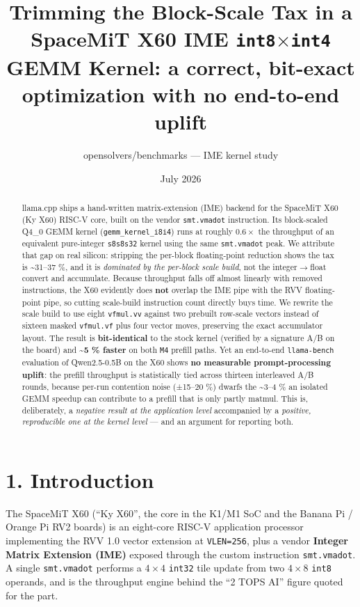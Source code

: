 \documentclass[
]{article}
\title{Trimming the Block-Scale Tax in a SpaceMiT X60 IME
\texttt{int8}\(\times\)\texttt{int4} GEMM Kernel: a correct, bit-exact
optimization with no end-to-end uplift}
\author{opensolvers/benchmarks --- IME kernel study}
\date{July 2026}
\begin{document}
\maketitle
\begin{abstract}
llama.cpp ships a hand-written matrix-extension (IME) backend for the
SpaceMiT X60 (Ky X60) RISC-V core, built on the vendor
\texttt{smt.vmadot} instruction. Its block-scaled Q4\_0 GEMM kernel
(\texttt{gemm\_kernel\_i8i4}) runs at roughly \(0.6\times\) the
throughput of an equivalent pure-integer \texttt{s8s8s32} kernel using
the same \texttt{smt.vmadot} peak. We attribute that gap on real
silicon: stripping the per-block floating-point reduction shows the tax
is \textasciitilde31--37 \%, and it is \emph{dominated by the per-block
scale build}, not the integer\(\to\)float convert and accumulate.
Because throughput falls off almost linearly with removed instructions,
the X60 evidently does \textbf{not} overlap the IME pipe with the RVV
floating-point pipe, so cutting scale-build instruction count directly
buys time. We rewrite the scale build to use eight \texttt{vfmul.vv}
against two prebuilt row-scale vectors instead of sixteen masked
\texttt{vfmul.vf} plus four vector moves, preserving the exact
accumulator layout. The result is \textbf{bit-identical} to the stock
kernel (verified by a signature A/B on the board) and
\textbf{\textasciitilde5 \% faster} on both \texttt{M4} prefill paths.
Yet an end-to-end \texttt{llama-bench} evaluation of Qwen2.5-0.5B on the
X60 shows \textbf{no measurable prompt-processing uplift}: the prefill
throughput is statistically tied across thirteen interleaved A/B rounds,
because per-run contention noise (±15--20 \%) dwarfs the
\textasciitilde3--4 \% an isolated GEMM speedup can contribute to a
prefill that is only partly matmul. This is, deliberately, a
\emph{negative result at the application level} accompanied by a
\emph{positive, reproducible one at the kernel level} --- and an
argument for reporting both.
\end{abstract}

\section{1. Introduction}\label{introduction}

The SpaceMiT X60 (``Ky X60'', the core in the K1/M1 SoC and the Banana
Pi / Orange Pi RV2 boards) is an eight-core RISC-V application processor
implementing the RVV 1.0 vector extension at \texttt{VLEN=256}, plus a
vendor \textbf{Integer Matrix Extension (IME)} exposed through the
custom instruction \texttt{smt.vmadot}. A single \texttt{smt.vmadot}
performs a \(4\times4\) \texttt{int32} tile update from two \(4\times8\)
\texttt{int8} operands, and is the throughput engine behind the ``2 TOPS
AI'' figure quoted for the part.
\end{document}

